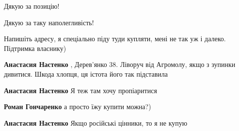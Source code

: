 \begin{itemize}
Дякую за позицію!

 
Дякую за таку наполегливість!

 
Напишіть адресу, я спеціально піду туди купляти, мені не так уж і далеко. Підтримка власнику)

\begin{itemize}
 
\textbf{Анастасия Настенко} , Дерев'янко 38. Ліворуч від Агромолу, якщо з зупинки дивитися. Шкода хлопця, ця істота його так підставила

 
\textbf{Анастасия Настенко} Я теж там хочу пропіаритися

 
\textbf{Роман Гончаренко} а просто їжу купити можна?)

 
\textbf{Анастасия Настенко} Якщо російські цінники, то я не купую


\end{itemize}
\end{itemize}
